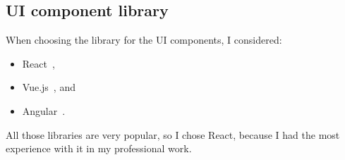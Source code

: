 \subsection{UI component library}\label{ui-component-library}

When choosing the library for the UI components, I considered:

\begin{itemize}
  \item
        React~\cite{oshannessy_react_2022},
  \item
        Vue.js~\cite{you_vuejs_2022}, and
  \item
        Angular~\cite{kalpakas_angular_2022}.
\end{itemize}

All those libraries are very popular,
so I chose React,
because I had the most experience with it in my professional work.

